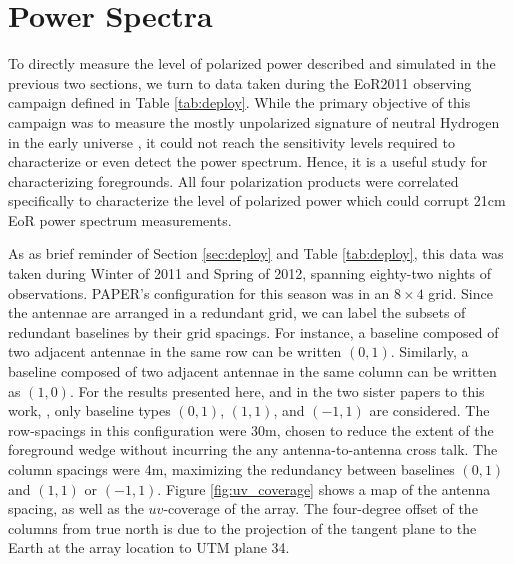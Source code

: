 \chapter{Power Spectra} \label{chap:PowerSpectra}

To directly measure the level of polarized power described and simulated in the previous two
sections, we turn to data taken during the EoR2011 observing campaign defined in Table
\ref{tab:deploy}. While the primary objective of this campaign was to measure the mostly unpolarized
signature of neutral Hydrogen in the early universe \cite{Parsons2014, Jacobs2014}, it could not
reach the sensitivity levels required to characterize or even detect the power spectrum. Hence, it
is a useful study for characterizing foregrounds. All four polarization products were correlated specifically to
characterize the level of polarized power which could corrupt 21cm EoR power spectrum measurements.

As as brief reminder of Section \ref{sec:deploy} and Table \ref{tab:deploy}, this data was
taken during Winter of 2011 and Spring of 2012, spanning eighty-two nights of observations.
PAPER's configuration for this season was in an $8\times4$ grid. Since the antennae are
arranged in a redundant grid, we can label the subsets of redundant baselines by their grid
spacings. For instance, a baseline composed of two adjacent antennae in the same row can be written
$(0,1)$. Similarly, a baseline composed of two adjacent antennae in the same column can be written
as $(1,0)$. For the results presented here, and in the two sister papers to this work,
\cite{Jacobs2014, Parsons2014}, only baseline types $(0,1)$, $(1,1)$, and $(-1,1)$ are considered. 
The row-spacings in this configuration were 30m, chosen to reduce the extent of the foreground wedge 
without incurring the any antenna-to-antenna cross talk. The column spacings were 4m, maximizing 
the redundancy between baselines $(0,1)$ and $(1,1)$ or $(-1,1)$. Figure \ref{fig:uv_coverage} shows
a map of the antenna spacing, as well as the $uv$-coverage of the array. The four-degree offset of
the columns from true north is due to the projection of the tangent plane to the Earth at the
array location to UTM plane 34.

